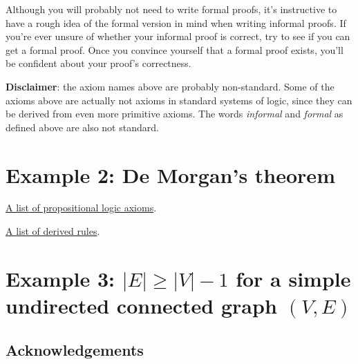 Although you will probably not need to write formal proofs, it's instructive to
have a rough idea of the formal version in mind when writing informal proofs.
If you're ever unsure of whether your informal proof is correct,
try to see if you can get a formal proof.
Once you convince yourself that a formal proof exists,
you'll be confident about your proof's correctness.

\textbf{Disclaimer}: the axiom names above are probably non-standard.
Some of the axioms above are actually not axioms in standard systems of logic,
since they can be derived from even more primitive axioms.
The words \emph{informal} and \emph{formal} as defined above are also not standard.

\section{Example 2: De Morgan's theorem}


\begin{tightemize}
\item \href{https://en.wikipedia.org/wiki/Propositional_calculus#Example_2._Natural_deduction_system}%
{A list of propositional logic axioms}.
\item \href{https://en.wikipedia.org/wiki/Propositional_calculus#Basic_and_derived_argument_forms}%
{A list of derived rules}.
\end{tightemize}

\section{Example 3: \texorpdfstring{$|E| \ge |V|-1$}{|E| >= |V|-1}
for a simple undirected connected graph \texorpdfstring{$(V, E)$}{(V, E)}}




\subsection*{Acknowledgements}

